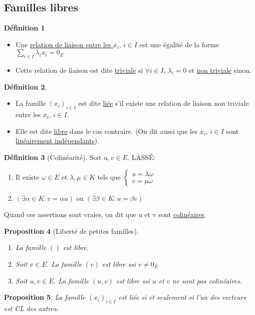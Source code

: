 \documentclass[10pt,a4paper]{article}
\theoremstyle{plain}
\newtheorem{proposition}{Proposition}[section]
\theoremstyle{definition}
\newtheorem{definition}[proposition]{Définition}
\begin{document}
\subsection{Familles libres}
\begin{definition}
\hfill
\begin{itemize}
\item Une \uline{relation de liaison entre les $x_i,\, i\in I$} est une égalité de la forme $\sum\limits_{i \in I} \lambda_i x_i = 0_E$
\item Cette relation de liaison est dite \uline{triviale} si $\forall i \in I$, $\lambda_i = 0$ et \uline{non triviale} sinon.
\end{itemize}
\end{definition}
\begin{definition}
\hfill
\begin{itemize}
\item La famille $(x_i)_{i \in I}$ est dite \uline{liée} s'il existe une relation de liaison non triviale entre les $x_i,\, i \in I$.
\item Elle est dite \uline{libre} dans le cas contraire. (On dit aussi que les $x_i,\, i \in I$ sont \uline{linéairement indépendants}).
\end{itemize}
\end{definition}

\pagebreak

\begin{definition}[Colinéarité]
Soit $u,v \in E$. LASSÉ:
\begin{enumerate}
\item Il existe $\omega \in E$ et $\lambda, \mu \in K$ tels que $\begin{cases}
u = \lambda \omega \\
v = \mu \omega
\end{cases}$
\item $(\exists \alpha \in K : v = \alpha u)$ ou $(\exists \beta \in K : u = \beta v)$
\end{enumerate}
Quand ces assertions sont vraies, on dit que u et v sont \uline{colinéaires}.
\end{definition}
\begin{proposition}[Liberté de petites familles]
\hfill
\begin{enumerate}
\item[0.] La famille $()$ est libre.
\item[1.] Soit $v \in E$. La famille $(v)$ est libre ssi $v \neq 0_E$
\item[2.] Soit $u,v \in E$. La famille $(u, v)$ est libre ssi $u$ et $v$ ne sont pas colinéaires.
\end{enumerate}
\end{proposition}
\begin{proposition}
La famille $(x_i)_{i \in I}$ est liée si et seulement si l'un des vecteurs est CL des autres.
\end{proposition}
\end{document}
